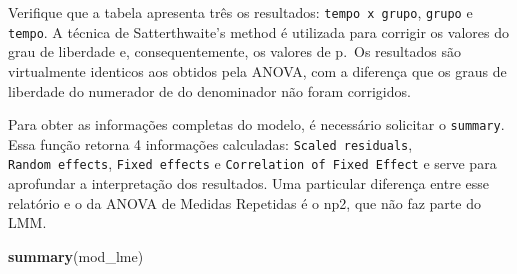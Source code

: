 \documentclass[
]{book}
\newenvironment{Shaded}{\begin{snugshade}}{\end{snugshade}}
\newcommand{\KeywordTok}[1]{\textcolor[rgb]{0.13,0.29,0.53}{\textbf{#1}}}
\newcommand{\NormalTok}[1]{#1}
\begin{document}
Verifique que a tabela apresenta três os resultados: \texttt{tempo\ x\ grupo}, \texttt{grupo} e \texttt{tempo}. A técnica de Satterthwaite's method é utilizada para corrigir os valores do grau de liberdade e, consequentemente, os valores de p.~Os resultados são virtualmente identicos aos obtidos pela ANOVA, com a diferença que os graus de liberdade do numerador de do denominador não foram corrigidos.

Para obter as informações completas do modelo, é necessário solicitar o \texttt{summary}. Essa função retorna 4 informações calculadas: \texttt{Scaled\ residuals}, \texttt{Random\ effects}, \texttt{Fixed\ effects} e \texttt{Correlation\ of\ Fixed\ Effect} e serve para aprofundar a interpretação dos resultados. Uma particular diferença entre esse relatório e o da ANOVA de Medidas Repetidas é o np2, que não faz parte do LMM.

\begin{Shaded}
\begin{Highlighting}[]
\KeywordTok{summary}\NormalTok{(mod_lme) }
\end{Highlighting}
\end{Shaded}
\end{document}
